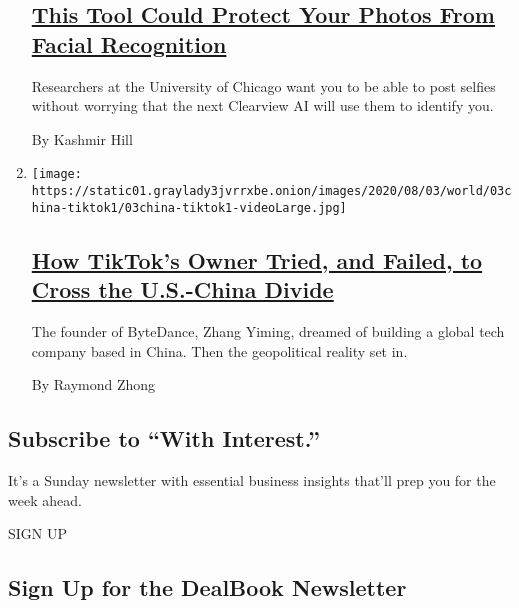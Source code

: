 \begin{enumerate}
  \hypertarget{this-tool-could-protect-your-photos-from-facial-recognition}{%
  \subsection{\texorpdfstring{\href{/2020/08/03/technology/fawkes-tool-protects-photos-from-facial-recognition.html}{This
  Tool Could Protect Your Photos From Facial
  Recognition}}{This Tool Could Protect Your Photos From Facial Recognition}}\label{this-tool-could-protect-your-photos-from-facial-recognition}}

  Researchers at the University of Chicago want you to be able to post
  selfies without worrying that the next Clearview AI will use them to
  identify you.

  By Kashmir Hill
\item
  \texttt{[image: https://static01.graylady3jvrrxbe.onion/images/2020/08/03/world/03china-tiktok1/03china-tiktok1-videoLarge.jpg]}

  \hypertarget{how-tiktoks-owner-tried-and-failed-to-cross-the-us-china-divide}{%
  \subsection{\texorpdfstring{\href{/2020/08/03/technology/tiktok-bytedance-us-china.html}{How
  TikTok's Owner Tried, and Failed, to Cross the U.S.-China
  Divide}}{How TikTok's Owner Tried, and Failed, to Cross the U.S.-China Divide}}\label{how-tiktoks-owner-tried-and-failed-to-cross-the-us-china-divide}}

  The founder of ByteDance, Zhang Yiming, dreamed of building a global
  tech company based in China. Then the geopolitical reality set in.

  By Raymond Zhong
\end{enumerate}

\hypertarget{subscribe-to-with-interest}{%
\subsection{Subscribe to ``With
Interest.''}\label{subscribe-to-with-interest}}

It's a Sunday newsletter with essential business insights that'll prep
you for the week ahead.

SIGN UP

\hypertarget{sign-up-for-the-dealbook-newsletter}{%
\subsection{Sign Up for the DealBook
Newsletter}\label{sign-up-for-the-dealbook-newsletter}}

